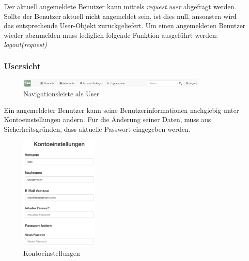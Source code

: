 Der aktuell angemeldete Benutzer kann mittels \textit{request.user} abgefragt werden. Sollte der Benutzer aktuell nicht angemeldet sein, ist dies null, ansonsten wird das entsprechende User-Objekt zurückgeliefert.
Um einen angemeldeten Benutzer wieder abzumelden muss lediglich folgende Funktion ausgeführt werden:
\textit{logout(request)}

\subsubsection{Usersicht}

\begin{figure}[ht]
\includegraphics[width=0.85\textwidth]{images/usermanagement/Usersicht}
	\caption{Navigationsleiste als User}
	\label{fig4}
\end{figure}

Ein angemeldeter Benutzer kann seine Benutzerinformationen nachgiebig unter Kontoeinstellungen ändern. Für die Änderung seiner Daten, muss aus Sicherheitsgründen, dass aktuelle Passwort eingegeben werden.

\begin{figure}[ht]
\includegraphics[width=0.35\textwidth]{images/usermanagement/Kontoeinstellungen}
	\caption{Kontoeinstellungen}
	\label{fig5}
\end{figure}

